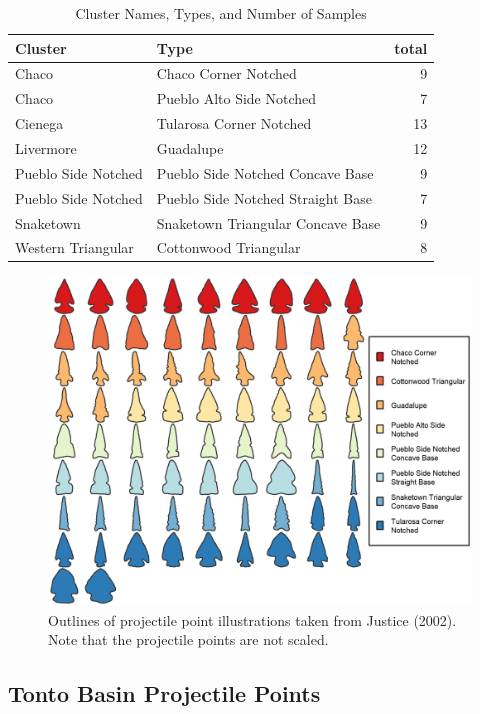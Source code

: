 \documentclass[a4paper]{article}
\begin{document}
\begin{table}

\caption{\label{tab:tblJusticeTypes}Cluster Names, Types, and Number of Samples}
\centering
\begin{tabular}[t]{llr}
\toprule
Cluster & Type & total\\
\midrule
Chaco & Chaco Corner Notched & 9\\
Chaco & Pueblo Alto Side Notched & 7\\
Cienega & Tularosa Corner Notched & 13\\
Livermore & Guadalupe & 12\\
Pueblo Side Notched & Pueblo Side Notched Concave Base & 9\\
\addlinespace
Pueblo Side Notched & Pueblo Side Notched Straight Base & 7\\
Snaketown & Snaketown Triangular Concave Base & 9\\
Western Triangular & Cottonwood Triangular & 8\\
\bottomrule
\end{tabular}
\end{table}

\begin{figure}
\includegraphics[width=1\linewidth]{figures/JusticePointsTypesFinal} \caption{Outlines of projectile point illustrations taken from Justice (2002). Note that the projectile points are not scaled.}\label{fig:JusticePointsTypesFinal}
\end{figure}

\hypertarget{tonto-basin-projectile-points}{%
\subsection*{Tonto Basin Projectile Points}\label{tonto-basin-projectile-points}}
\end{document}
